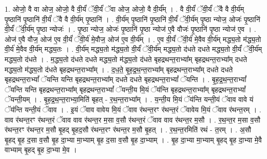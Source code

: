 \documentclass[17pt]{extarticle}
\begin{document}
1. ओजो॒ वै वा ओज॒ ओजो॒ वै वी॒र्यं॑ ॅवी॒र्यं॑ ॅवा ओज॒ ओजो॒ वै वी॒र्य᳚म् । . वै वी॒र्यं॑ ॅवी॒र्यं॑ ॅवै वै वी॒र्य॑म् पृ॒ष्ठानि॑ पृ॒ष्ठानि॑ वी॒र्यं॑ ॅवै वै वी॒र्य॑म् पृ॒ष्ठानि॑ । . वी॒र्य॑म् पृ॒ष्ठानि॑ पृ॒ष्ठानि॑ वी॒र्यं॑ ॅवी॒र्य॑म् पृ॒ष्ठा न्योज॒ ओजः॑ पृ॒ष्ठानि॑ वी॒र्यं॑ ॅवी॒र्य॑म् पृ॒ष्ठा न्योजः॑ । . पृ॒ष्ठा न्योज॒ ओजः॑ पृ॒ष्ठानि॑ पृ॒ष्ठा न्योज॑ ए॒वै वौजः॑ पृ॒ष्ठानि॑ पृ॒ष्ठा न्योज॑ ए॒व । . ओज॑ ए॒वै वौज॒ ओज॑ ए॒व वी॒र्यं॑ ॅवी॒र्य॑ मे॒वौज॒ ओज॑ ए॒व वी॒र्य᳚म् । . ए॒व वी॒र्यं॑ ॅवी॒र्य॑ मे॒वैव वी॒र्य॑म् मद्ध्य॒तो म॑द्ध्य॒तो वी॒र्य॑ मे॒वैव वी॒र्य॑म् मद्ध्य॒तः । . वी॒र्य॑म् मद्ध्य॒तो म॑द्ध्य॒तो वी॒र्यं॑ ॅवी॒र्य॑म् मद्ध्य॒तो द॑धते दधते मद्ध्य॒तो वी॒र्यं॑ ॅवी॒र्य॑म् मद्ध्य॒तो द॑धते । . म॒द्ध्य॒तो द॑धते दधते मद्ध्य॒तो म॑द्ध्य॒तो द॑धते बृहद्रथन्त॒राभ्या᳚म् बृहद्रथन्त॒राभ्या᳚म् दधते मद्ध्य॒तो म॑द्ध्य॒तो द॑धते बृहद्रथन्त॒राभ्या᳚म् । . द॒ध॒ते॒ बृ॒ह॒द्र॒थ॒न्त॒राभ्या᳚म् बृहद्रथन्त॒राभ्या᳚म् दधते दधते बृहद्रथन्त॒राभ्यां᳚ ॅयन्ति यन्ति बृहद्रथन्त॒राभ्या᳚म् दधते दधते बृहद्रथन्त॒राभ्यां᳚ ॅयन्ति । . बृ॒ह॒द्र॒थ॒न्त॒राभ्यां᳚ ॅयन्ति यन्ति बृहद्रथन्त॒राभ्या᳚म् बृहद्रथन्त॒राभ्यां᳚ ॅयन्ती॒य मि॒यं ॅय॑न्ति बृहद्रथन्त॒राभ्या᳚म् बृहद्रथन्त॒राभ्यां᳚ ॅयन्ती॒यम् । . बृ॒ह॒द्र॒थ॒न्त॒राभ्या॒मिति॑ बृहत् - र॒थ॒न्त॒राभ्या᳚म् । . य॒न्ती॒य मि॒यं ॅय॑न्ति यन्ती॒यं ॅवाव वावे यं ॅय॑न्ति यन्ती॒यं ॅवाव । . इ॒यं ॅवाव वावेय मि॒यं ॅवाव र॑थन्त॒रꣳ र॑थन्त॒रं ॅवावेय मि॒यं ॅवाव र॑थन्त॒रम् । . वाव र॑थन्त॒रꣳ र॑थन्त॒रं ॅवाव वाव र॑थन्त॒र म॒सा व॒सौ र॑थन्त॒रं ॅवाव वाव र॑थन्त॒र म॒सौ । . र॒थ॒न्त॒र म॒सा व॒सौ र॑थन्त॒रꣳ र॑थन्त॒र म॒सौ बृ॒हद् बृ॒हद॒सौ र॑थन्त॒रꣳ र॑थन्त॒र म॒सौ बृ॒हत् । . र॒थ॒न्त॒रमिति॑ रथं - त॒रम् । . अ॒सौ बृ॒हद् बृ॒ह द॒सा व॒सौ बृ॒ह दा॒भ्या मा॒भ्याम् बृ॒ह द॒सा व॒सौ बृ॒ह दा॒भ्याम् । . बृ॒ह दा॒भ्या मा॒भ्याम् बृ॒हद् बृ॒ह दा॒भ्या मे॒वै वाभ्याम् बृ॒हद् बृ॒ह दा॒भ्या मे॒व । \newline
\end{document}
